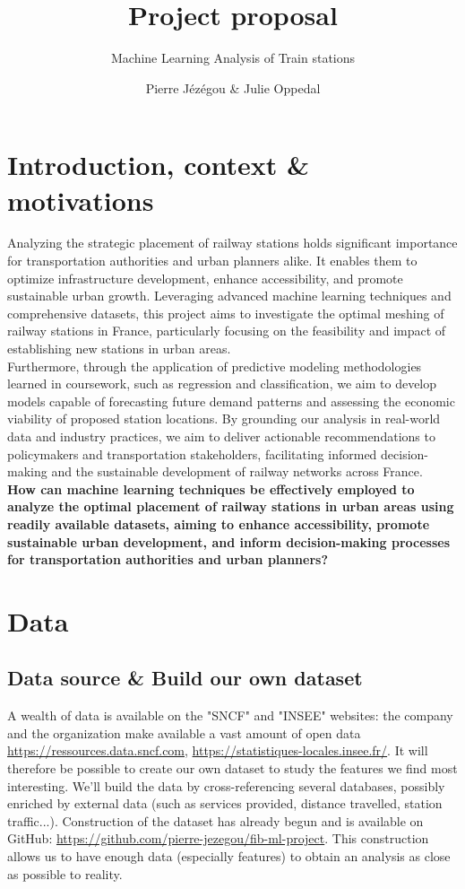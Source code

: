 \documentclass[10pt,a4paper,hidelinks]{article}
\title{Project proposal}
\subtitle{Machine Learning Analysis of Train stations}
\date{}
\author{Pierre Jézégou \& Julie Oppedal}
\begin{document}
\maketitle

\section{Introduction, context \& motivations}
Analyzing the strategic placement of railway stations holds significant importance for transportation authorities and urban planners alike. It enables them to optimize infrastructure development, enhance accessibility, and promote sustainable urban growth. Leveraging advanced machine learning techniques and comprehensive datasets, this project aims to investigate the optimal meshing of railway stations in France, particularly focusing on the feasibility and impact of establishing new stations in urban areas.\\
Furthermore, through the application of predictive modeling methodologies learned in coursework, such as regression and classification, we aim to develop models capable of forecasting future demand patterns and assessing the economic viability of proposed station locations. By grounding our analysis in real-world data and industry practices, we aim to deliver actionable recommendations to policymakers and transportation stakeholders, facilitating informed decision-making and the sustainable development of railway networks across France.
\\

\textbf{How can machine learning techniques be effectively employed to analyze the optimal placement of railway stations in urban areas using readily available datasets, aiming to enhance accessibility, promote sustainable urban development, and inform decision-making processes for transportation authorities and urban planners?}

\section{Data}
\subsection{Data source \& Build our own dataset}
A wealth of data is available on the "SNCF" and "INSEE" websites: the company and the organization make available a vast amount of open data \url{https://ressources.data.sncf.com}, \url{https://statistiques-locales.insee.fr/}. It will therefore be possible to create our own dataset to study the features we find most interesting. We'll build the data by cross-referencing several databases, possibly enriched by external data (such as services provided, distance travelled, station traffic...). 
Construction of the dataset has already begun and is available on GitHub: \url{https://github.com/pierre-jezegou/fib-ml-project}.  This construction allows us to have enough data (especially features) to obtain an analysis as close as possible to reality.
\end{document}
